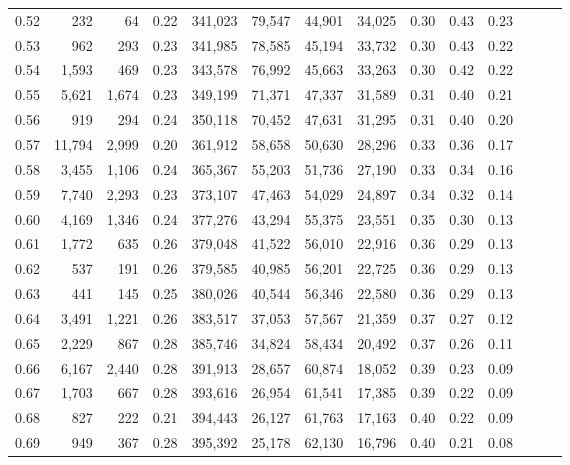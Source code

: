 \begin{tabular}{rrrrrrrrrrrrrr}
0.52 &     232 &     64 &  0.22 &  341,023 &   79,547 &  44,901 &  34,025 &  0.30 &  0.43 &      0.23 \\
0.53 &     962 &    293 &  0.23 &  341,985 &   78,585 &  45,194 &  33,732 &  0.30 &  0.43 &      0.22 \\
0.54 &   1,593 &    469 &  0.23 &  343,578 &   76,992 &  45,663 &  33,263 &  0.30 &  0.42 &      0.22 \\
0.55 &   5,621 &  1,674 &  0.23 &  349,199 &   71,371 &  47,337 &  31,589 &  0.31 &  0.40 &      0.21 \\
0.56 &     919 &    294 &  0.24 &  350,118 &   70,452 &  47,631 &  31,295 &  0.31 &  0.40 &      0.20 \\
0.57 &  11,794 &  2,999 &  0.20 &  361,912 &   58,658 &  50,630 &  28,296 &  0.33 &  0.36 &      0.17 \\
0.58 &   3,455 &  1,106 &  0.24 &  365,367 &   55,203 &  51,736 &  27,190 &  0.33 &  0.34 &      0.16 \\
0.59 &   7,740 &  2,293 &  0.23 &  373,107 &   47,463 &  54,029 &  24,897 &  0.34 &  0.32 &      0.14 \\
0.60 &   4,169 &  1,346 &  0.24 &  377,276 &   43,294 &  55,375 &  23,551 &  0.35 &  0.30 &      0.13 \\
0.61 &   1,772 &    635 &  0.26 &  379,048 &   41,522 &  56,010 &  22,916 &  0.36 &  0.29 &      0.13 \\
0.62 &     537 &    191 &  0.26 &  379,585 &   40,985 &  56,201 &  22,725 &  0.36 &  0.29 &      0.13 \\
0.63 &     441 &    145 &  0.25 &  380,026 &   40,544 &  56,346 &  22,580 &  0.36 &  0.29 &      0.13 \\
0.64 &   3,491 &  1,221 &  0.26 &  383,517 &   37,053 &  57,567 &  21,359 &  0.37 &  0.27 &      0.12 \\
0.65 &   2,229 &    867 &  0.28 &  385,746 &   34,824 &  58,434 &  20,492 &  0.37 &  0.26 &      0.11 \\
0.66 &   6,167 &  2,440 &  0.28 &  391,913 &   28,657 &  60,874 &  18,052 &  0.39 &  0.23 &      0.09 \\
0.67 &   1,703 &    667 &  0.28 &  393,616 &   26,954 &  61,541 &  17,385 &  0.39 &  0.22 &      0.09 \\
0.68 &     827 &    222 &  0.21 &  394,443 &   26,127 &  61,763 &  17,163 &  0.40 &  0.22 &      0.09 \\
0.69 &     949 &    367 &  0.28 &  395,392 &   25,178 &  62,130 &  16,796 &  0.40 &  0.21 &      0.08 \\

\end{tabular}
